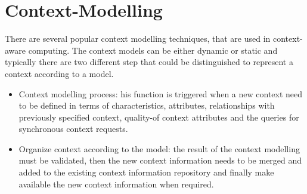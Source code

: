 \documentclass{thesisreport}
\begin{document}
\section{Context-Modelling}
 There are several popular context modelling techniques, that are used in context-aware computing. The context models can be either dynamic or static and typically there are two different step that could be distinguished to represent a context according to a model.
 \begin{itemize}
     \item Context modelling process: his function is triggered when a new context need to be defined in terms of characteristics, attributes, relationships with previously specified context, quality-of context attributes and the queries for synchronous context requests.
     \item Organize context according to the model: the result of the context modelling must be validated, then the new context information needs to be merged and added to the existing context information repository and finally make available the new context information when required.
 \end{itemize}
 
\end{document}
